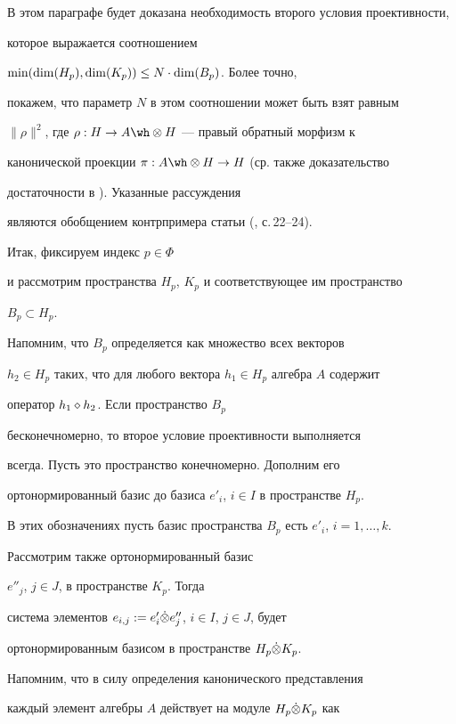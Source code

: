 В этом параграфе будет доказана необходимость второго условия проективности,


которое выражается соотношением


$\min (\dim (H_p),\dim (K_p))\le N \cdot \dim (B_p)$. Более точно,


покажем, что параметр $N$ в этом соотношении может быть взят равным


$\| \rho\|^2$, где $\rho: H \to A \tens H$ --- правый обратный морфизм к


канонической проекции $\pi :A \tens H \to H$ (ср. также доказательство


достаточности в \cite{Chel5}). Указанные рассуждения


являются обобщением контрпримера статьи (\cite{Chel44}, с.\,22--24).





Итак, фиксируем индекс $p\in\Phi$


и рассмотрим пространства $H_p$, $K_p$ и соответствующее им пространство


$B_p \subset H_p$.


Напомним, что $B_p$ определяется как множество всех векторов


$h_2 \in H_p$ таких, что для любого вектора $h_1 \in H_p$ алгебра $A$ содержит


оператор $h_1 \diamond h_2$. Если пространство $B_p$ 


бесконечномерно, то второе условие проективности выполняется


всегда. Пусть это пространство конечномерно. Дополним его


ортонормированный базис до базиса $e'_i$, $i \in I$ в пространстве $H_p$.


В этих обозначениях пусть базис пространства $B_p$ есть $e'_i$, $i=1,\dotsc,k$.


Рассмотрим также ортонормированный базис


$e''_j$, $j \in J$, в пространстве $K_p$. Тогда


система элементов $e_{i,j}:=e'_i \Dot \otimes e''_j$, $i \in I$, $j \in J$, будет


ортонормированным базисом в пространстве $H_p \Dot \otimes K_p$.





Напомним, что в силу определения канонического представления


каждый элемент алгебры $A$ действует на модуле $H_p \Dot \otimes K_p$ как


